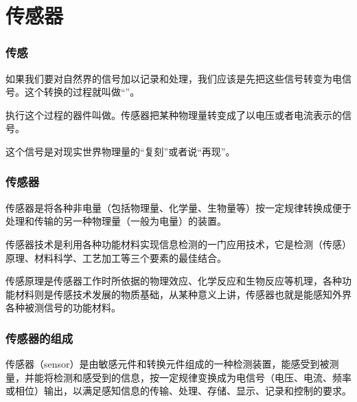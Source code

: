 \section{传感器}

\begin{frame}
    \frametitle{传感}
    如果我们要对自然界的信号加以记录和处理，我们应该是先把这些信号转变为电信号。这个转换的过程就叫做“”。

    执行这个过程的器件叫做。传感器把某种物理量转变成了以电压或者电流表示的信号。

    这个信号是对现实世界物理量的“复刻”或者说“再现”。

\end{frame}

\begin{frame}
    \frametitle{传感器}
    传感器是将各种非电量（包括物理量、化学量、生物量等）按一定规律转换成便于处理和传输的另一种物理量（一般为电量）的装置。

传感器技术是利用各种功能材料实现信息检测的一门应用技术，它是检测（传感）原理、材料科学、工艺加工等三个要素的最佳结合。

传感原理是传感器工作时所依据的物理效应、化学反应和生物反应等机理，各种功能材料则是传感技术发展的物质基础，从某种意义上讲，传感器也就是能感知外界各种被测信号的功能材料。

\end{frame}

\begin{frame}
    \frametitle{传感器的组成}
    传感器（sensor）是由敏感元件和转换元件组成的一种检测装置，能感受到被测量，并能将检测和感受到的信息，按一定规律变换成为电信号（电压、电流、频率或相位）输出，以满足感知信息的传输、处理、存储、显示、记录和控制的要求。
    \bigskip

    \begin{center}
    \end{center}
\end{frame}





